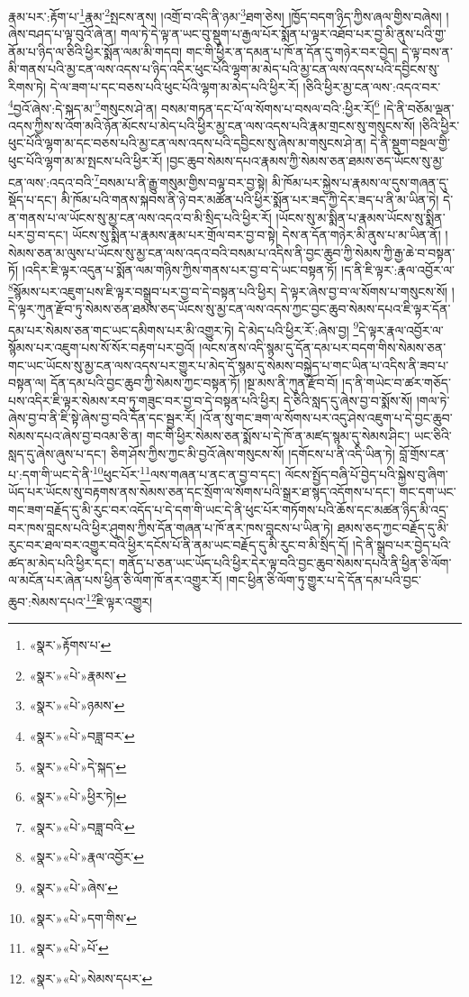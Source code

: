 རྣམ་པར་:རྟོག་པ་\footnote{«སྣར་»རྟོགས་པ་}རྣམ་\footnote{«སྣར་»«པེ་»རྣམས་}སྤངས་ནས། །འགྲོ་བ་འདི་ནི་ཉམ་\footnote{«སྣར་»«པེ་»ཉམས་}ཐག་ཅེས། །ཁྱོད་བདག་ཉིད་ཀྱིས་ཞལ་གྱིས་བཞེས། །ཞེས་བཤད་པ་ལྟ་བུའོ་ཞེ་ན། གལ་ཏེ་དེ་ལྟ་ན་ཡང་བུ་སྡུག་པ་རྒྱལ་པོར་སྨོན་པ་ལྟར་འཐོབ་པར་བྱ་མི་ནུས་པའི་གྱ་ནོམ་པ་ཉིད་ལ་ཅིའི་ཕྱིར་སྨོན་ལམ་མི་གདབ། གང་གི་ཕྱིར་ན་དམན་པ་ཁོ་ན་དོན་དུ་གཉེར་བར་བྱེད། དེ་ལྟ་བས་ན་མི་གནས་པའི་མྱ་ངན་ལས་འདས་པ་ཉིད་འདིར་ཕུང་པོའི་ལྷག་མ་མེད་པའི་མྱ་ངན་ལས་འདས་པའི་དབྱིངས་སུ་རིགས་ཏེ། དེ་ལ་ཟག་པ་དང་བཅས་པའི་ཕུང་པོའི་ལྷག་མ་མེད་པའི་ཕྱིར་རོ། །ཅིའི་ཕྱིར་མྱ་ངན་ལས་:འདའ་བར་\footnote{«སྣར་»«པེ་»བཟླ་བར་}བྱའོ་ཞེས་:དེ་སྐད་མ་\footnote{«སྣར་»«པེ་»དེ་སྐད་}གསུངས་ཤེ་ན། བསམ་གཏན་དང་པོ་ལ་སོགས་པ་བསལ་བའི་:ཕྱིར་རོ།\footnote{«སྣར་»«པེ་»ཕྱིར་ཏེ།} །དེ་ནི་བཅོམ་ལྡན་འདས་ཀྱིས་ས་འོག་མའི་ཉོན་མོངས་པ་མེད་པའི་ཕྱིར་མྱ་ངན་ལས་འདས་པའི་རྣམ་གྲངས་སུ་གསུངས་སོ། །ཅིའི་ཕྱིར་ཕུང་པོའི་ལྷག་མ་དང་བཅས་པའི་མྱ་ངན་ལས་འདས་པའི་དབྱིངས་སུ་ཞེས་མ་གསུངས་ཤེ་ན། དེ་ནི་སྡུག་བསྔལ་གྱི་ཕུང་པོའི་ལྷག་མ་མ་སྤངས་པའི་ཕྱིར་རོ། །བྱང་ཆུབ་སེམས་དཔའ་རྣམས་ཀྱི་སེམས་ཅན་ཐམས་ཅད་ཡོངས་སུ་མྱ་ངན་ལས་:འདའ་བའི་\footnote{«སྣར་»«པེ་»བཟླ་བའི་}བསམ་པ་ནི་རྒྱུ་གསུམ་གྱིས་བལྟ་བར་བྱ་སྟེ། མི་ཁོམ་པར་སྐྱེས་པ་རྣམས་ལ་དུས་གཞན་དུ་སྡོད་པ་དང་། མི་ཁོམ་པའི་གནས་སྐབས་ནི་ཉེ་བར་མཚོན་པའི་ཕྱིར་སྨོན་པར་ཟད་ཀྱི་དེར་ཟད་པ་ནི་མ་ཡིན་ཏེ། དེ་ན་གནས་པ་ལ་ཡོངས་སུ་མྱ་ངན་ལས་འདའ་བ་མི་སྲིད་པའི་ཕྱིར་རོ། །ཡོངས་སུ་མ་སྨིན་པ་རྣམས་ཡོངས་སུ་སྨིན་པར་བྱ་བ་དང་། ཡོངས་སུ་སྨིན་པ་རྣམས་རྣམ་པར་གྲོལ་བར་བྱ་བ་སྟེ། དེས་ན་དོན་གཉེར་མི་ནུས་པ་མ་ཡིན་ནོ། །སེམས་ཅན་མ་ལུས་པ་ཡོངས་སུ་མྱ་ངན་ལས་འདའ་བའི་བསམ་པ་འདིས་ནི་བྱང་ཆུབ་ཀྱི་སེམས་ཀྱི་རྒྱ་ཆེ་བ་བསྟན་ཏོ། །འདིར་ཇི་ལྟར་འདུན་པ་སྨོན་ལམ་གཉིས་ཀྱིས་གནས་པར་བྱ་བ་དེ་ཡང་བསྟན་ཏོ། །ད་ནི་ཇི་ལྟར་:རྣལ་འབྱོར་ལ་\footnote{«སྣར་»«པེ་»རྣལ་འབྱོར་}སྙོམས་པར་འཇུག་པས་ཇི་ལྟར་བསྒྲུབ་པར་བྱ་བ་དེ་བསྟན་པའི་ཕྱིར། དེ་ལྟར་ཞེས་བྱ་བ་ལ་སོགས་པ་གསུངས་སོ། །དེ་ལྟར་ཀུན་རྫོབ་ཏུ་སེམས་ཅན་ཐམས་ཅད་ཡོངས་སུ་མྱ་ངན་ལས་འདས་ཀྱང་བྱང་ཆུབ་སེམས་དཔའ་ཇི་ལྟར་དོན་དམ་པར་སེམས་ཅན་གང་ཡང་དམིགས་པར་མི་འགྱུར་ཏེ། དེ་མེད་པའི་ཕྱིར་རོ་:ཞེས་བྱ། \footnote{«སྣར་»«པེ་»ཞེས་}དེ་ལྟར་རྣལ་འབྱོར་ལ་སྙོམས་པར་འཇུག་པས་སོ་སོར་བརྟག་པར་བྱའོ། །ལངས་ནས་འདི་སྙམ་དུ་དོན་དམ་པར་བདག་གིས་སེམས་ཅན་གང་ཡང་ཡོངས་སུ་མྱ་ངན་ལས་འདས་པར་གྱུར་པ་མེད་དོ་སྙམ་དུ་སེམས་བསྐྱེད་པ་གང་ཡིན་པ་འདིས་ནི་ཟབ་པ་བསྟན་ལ། དོན་དམ་པའི་བྱང་ཆུབ་ཀྱི་སེམས་ཀྱང་བསྟན་ཏོ། །སྔ་མས་ནི་ཀུན་རྫོབ་བོ། །ད་ནི་གཡེང་བ་ཚར་གཅོད་པས་འདིར་ཇི་ལྟར་སེམས་རབ་ཏུ་གཟུང་བར་བྱ་བ་དེ་བསྟན་པའི་ཕྱིར། དེ་ཅིའི་སླད་དུ་ཞེས་བྱ་བ་སྨོས་སོ། །གལ་ཏེ་ཞེས་བྱ་བ་ནི་ཇི་སྟེ་ཞེས་བྱ་བའི་དོན་དང་སྦྱར་རོ། །འོ་ན་སུ་གང་ཟག་ལ་སོགས་པར་འདུ་ཤེས་འཇུག་པ་དེ་བྱང་ཆུབ་སེམས་དཔའ་ཞེས་བྱ་བའམ་ཅི་ན། གང་གི་ཕྱིར་སེམས་ཅན་སྨོས་པ་དེ་ཁོ་ན་མཛད་སྙམ་དུ་སེམས་ཤིང་། ཡང་ཅིའི་སླད་དུ་ཞེས་ཞུས་པ་དང་། ཅིག་ཤོས་ཀྱིས་ཀྱང་མི་བྱའོ་ཞེས་གསུངས་སོ། །དགོངས་པ་ནི་འདི་ཡིན་ཏེ། བློ་གྲོས་ངན་པ་:དག་གི་ཡང་དེ་ནི་\footnote{«སྣར་»«པེ་»དག་གིས་}ཕུང་པོར་\footnote{«སྣར་»«པེ་»པོ་}ལས་གཞན་པ་ནང་ན་བྱ་བ་དང་། ལོངས་སྤྱོད་བཞི་པོ་བྱེད་པའི་སྐྱེས་བུ་ཞིག་ཡོད་པར་ཡོངས་སུ་བརྟགས་ནས་སེམས་ཅན་དང་སྲོག་ལ་སོགས་པའི་སྒྲར་ཐ་སྙད་འདོགས་པ་དང་། གང་དག་ཡང་གང་ཟག་བརྗོད་དུ་མི་རུང་བར་འདོད་པ་དེ་དག་གི་ཡང་དེ་ནི་ཕུང་པོར་གཏོགས་པའི་ཆོས་དང་མཚན་ཉིད་མི་འདྲ་བར་ཁས་བླངས་པའི་ཕྱིར་ཤུགས་ཀྱིས་དོན་གཞན་པ་ཁོ་ནར་ཁས་བླངས་པ་ཡིན་ཏེ། ཐམས་ཅད་ཀྱང་བརྗོད་དུ་མི་རུང་བར་ཐལ་བར་འགྱུར་བའི་ཕྱིར་དངོས་པོ་ནི་ནམ་ཡང་བརྗོད་དུ་མི་རུང་བ་མི་སྲིད་དོ། །དེ་ནི་སྒྲུབ་པར་བྱེད་པའི་ཚད་མ་མེད་པའི་ཕྱིར་དང་། གནོད་པ་ཅན་ཡང་ཡོད་པའི་ཕྱིར་དེར་ལྟ་བའི་བྱང་ཆུབ་སེམས་དཔའ་ནི་ཕྱིན་ཅི་ལོག་ལ་མངོན་པར་ཞེན་པས་ཕྱིན་ཅི་ལོག་ཁོ་ནར་འགྱུར་རོ། །གང་ཕྱིན་ཅི་ལོག་ཏུ་གྱུར་པ་དེ་དོན་དམ་པའི་བྱང་ཆུབ་:སེམས་དཔའ་\footnote{«སྣར་»«པེ་»སེམས་དཔར་}ཇི་ལྟར་འགྱུར། 